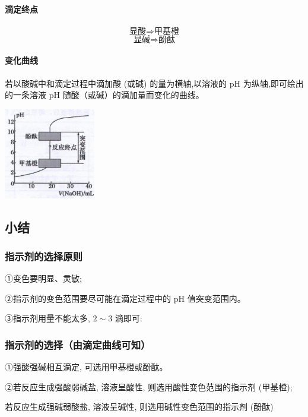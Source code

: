 \documentclass[10pt,cn]{elegantbook}
\begin{document}
\paragraph{滴定终点}

\[\mbox{显酸}\Rightarrow\mbox{甲基橙}\]
\[\mbox{显碱}\Rightarrow\mbox{酚酞}\]
\paragraph{变化曲线}

若以酸碱中和滴定过程中滴加酸 (或碱) 的量为横轴,以溶液的 \(\mathrm{{pH}}\) 为纵轴,即可绘出的一条溶液 \(\mathrm{{pH}}\) 随酸（或碱）的滴加量而变化的曲线。

\begin{center}
	\includegraphics[max width=0.3\textwidth]{image/c5.jpg}
\end{center}

\subsection{小结}

\subsubsection{指示剂的选择原则}

①变色要明显、灵敏;

②指示剂的变色范围要尽可能在滴定过程中的 \(\mathrm{{pH}}\) 值突变范围内。

③指示剂用量不能太多, \(2 \sim 3\) 滴即可:

\subsubsection{指示剂的选择（由滴定曲线可知）}

①强酸强碱相互滴定, 可选用甲基橙或酚酞。

②若反应生成强酸弱碱盐, 溶液呈酸性, 则选用酸性变色范围的指示剂 (甲基橙);

若反应生成强碱弱酸盐, 溶液呈碱性, 则选用碱性变色范围的指示剂 (酚酞)
\end{document}
